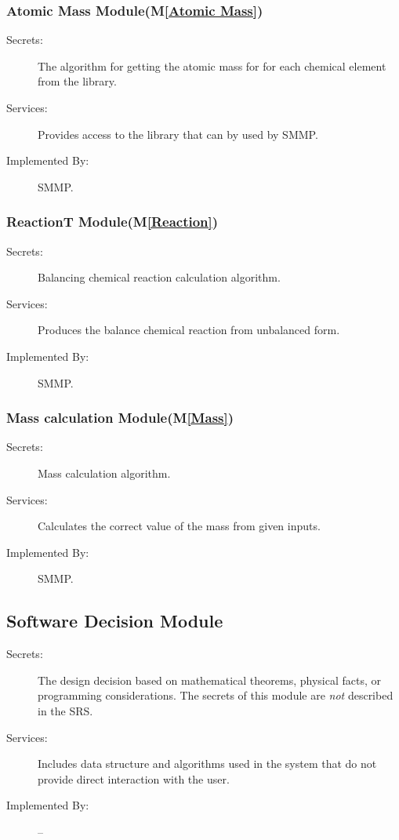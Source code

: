 \documentclass[12pt, titlepage]{article}
\newcommand{\mref}[1]{M\ref{#1}}
\begin{document}
\subsubsection{Atomic Mass Module(\mref{Atomic Mass})}

\begin{description}
\item[Secrets:] The algorithm for getting the atomic mass for for each chemical element from the library.
\item[Services:] Provides access to the library that can by used by SMMP.
\item[Implemented By:] SMMP.
\end{description}

\subsubsection{ReactionT Module(\mref{Reaction})}

\begin{description}
\item[Secrets:] Balancing chemical reaction calculation algorithm.
\item[Services:] Produces the balance chemical reaction from unbalanced form.
\item[Implemented By:] SMMP.
\end{description}

\subsubsection{Mass calculation Module(\mref{Mass})}

\begin{description}
\item[Secrets:] Mass calculation algorithm.
\item[Services:] Calculates the correct value of the mass from given inputs.
\item[Implemented By:] SMMP.
\end{description}


\subsection{Software Decision Module}

\begin{description}
\item[Secrets:] The design decision based on mathematical theorems, physical
  facts, or programming considerations. The secrets of this module are
  \emph{not} described in the SRS.
\item[Services:] Includes data structure and algorithms used in the system that
  do not provide direct interaction with the user. 
\item[Implemented By:] --
\end{description}
\end{document}
